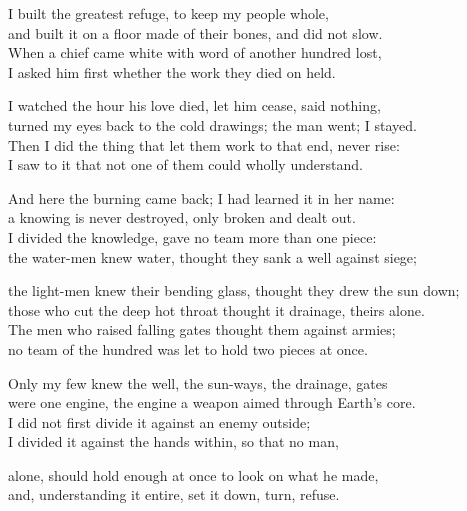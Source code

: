 \begin{founder}
I built the greatest refuge, to keep my people whole,\\
and built it on a floor made of their bones, and did not slow.\\
When a chief came white with word of another hundred lost,\\
I asked him first whether the work they died on held.\\
\medskip

I watched the hour his love died, let him cease, said nothing,\\
turned my eyes back to the cold drawings; the man went; I stayed.\\
Then I did the thing that let them work to that end, never rise:\\
I saw to it that not one of them could wholly understand.\\
\medskip

And here the burning came back; I had learned it in her name:\\
a knowing is never destroyed, only broken and dealt out.\\
I divided the knowledge, gave no team more than one piece:\\
the water-men knew water, thought they sank a well against siege;\\
\medskip

the light-men knew their bending glass, thought they drew the sun down;\\
those who cut the deep hot throat thought it drainage, theirs alone.\\
The men who raised falling gates thought them against armies;\\
no team of the hundred was let to hold two pieces at once.\\
\medskip

Only my few knew the well, the sun-ways, the drainage, gates\\
were one engine, the engine a weapon aimed through Earth's core.\\
I did not first divide it against an enemy outside;\\
I divided it against the hands within, so that no man,\\
\medskip

alone, should hold enough at once to look on what he made,\\
and, understanding it entire, set it down, turn, refuse.
\end{founder}

\ornament

